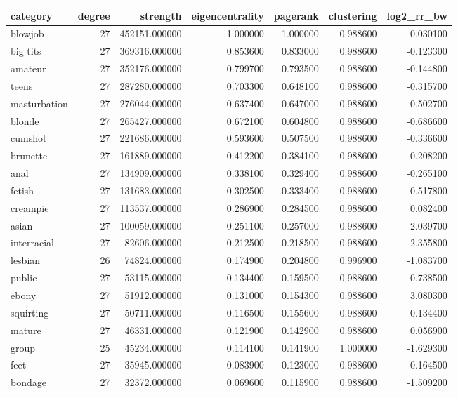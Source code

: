 \begin{tabular}{lrrrrrr}
\toprule
category & degree & strength & eigencentrality & pagerank & clustering & log2_rr_bw \\
\midrule
blowjob & 27 & 452151.000000 & 1.000000 & 1.000000 & 0.988600 & 0.030100 \\
big tits & 27 & 369316.000000 & 0.853600 & 0.833000 & 0.988600 & -0.123300 \\
amateur & 27 & 352176.000000 & 0.799700 & 0.793500 & 0.988600 & -0.144800 \\
teens & 27 & 287280.000000 & 0.703300 & 0.648100 & 0.988600 & -0.315700 \\
masturbation & 27 & 276044.000000 & 0.637400 & 0.647000 & 0.988600 & -0.502700 \\
blonde & 27 & 265427.000000 & 0.672100 & 0.604800 & 0.988600 & -0.686600 \\
cumshot & 27 & 221686.000000 & 0.593600 & 0.507500 & 0.988600 & -0.336600 \\
brunette & 27 & 161889.000000 & 0.412200 & 0.384100 & 0.988600 & -0.208200 \\
anal & 27 & 134909.000000 & 0.338100 & 0.329400 & 0.988600 & -0.265100 \\
fetish & 27 & 131683.000000 & 0.302500 & 0.333400 & 0.988600 & -0.517800 \\
creampie & 27 & 113537.000000 & 0.286900 & 0.284500 & 0.988600 & 0.082400 \\
asian & 27 & 100059.000000 & 0.251100 & 0.257000 & 0.988600 & -2.039700 \\
interracial & 27 & 82606.000000 & 0.212500 & 0.218500 & 0.988600 & 2.355800 \\
lesbian & 26 & 74824.000000 & 0.174900 & 0.204800 & 0.996900 & -1.083700 \\
public & 27 & 53115.000000 & 0.134400 & 0.159500 & 0.988600 & -0.738500 \\
ebony & 27 & 51912.000000 & 0.131000 & 0.154300 & 0.988600 & 3.080300 \\
squirting & 27 & 50711.000000 & 0.116500 & 0.155600 & 0.988600 & 0.134400 \\
mature & 27 & 46331.000000 & 0.121900 & 0.142900 & 0.988600 & 0.056900 \\
group & 25 & 45234.000000 & 0.114100 & 0.141900 & 1.000000 & -1.629300 \\
feet & 27 & 35945.000000 & 0.083900 & 0.123000 & 0.988600 & -0.164500 \\
bondage & 27 & 32372.000000 & 0.069600 & 0.115900 & 0.988600 & -1.509200 \\

\end{tabular}
